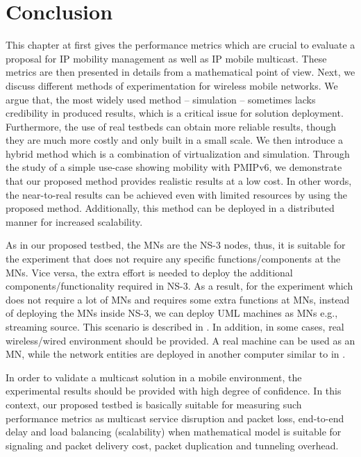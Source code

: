 \section{Conclusion}
This chapter at first gives the performance metrics which are crucial to evaluate a proposal for IP mobility management as well as IP mobile multicast. These metrics are then presented in details from a mathematical point of view. Next, we discuss different methods of experimentation for wireless mobile networks. We argue that, the most widely used method – simulation – sometimes lacks credibility in produced results, which is a critical issue for solution deployment. Furthermore, the use of real testbeds can obtain more reliable results, though they are much more costly and only built in a small scale. We then introduce a hybrid method which is a combination of virtualization and simulation. Through the study of a simple use-case showing mobility with PMIPv6, we demonstrate that our proposed method provides realistic results at a low cost. In other words, the near-to-real results can be achieved even with limited resources by using the proposed method.  Additionally, this method can be deployed in a distributed manner for increased scalability.

As in our proposed testbed, the MNs are the NS-3 nodes, thus, it is suitable for the experiment that does not require any specific functions/components at the MNs. Vice versa, the extra effort is needed to deploy the additional components/functionality required in NS-3. As a result, for the experiment which does not require a lot of MNs and requires some extra functions at MNs, instead of deploying the MNs inside NS-3, we can deploy UML machines as MNs e.g., streaming source. This scenario is described in \cite{Thinh_Springer}. In addition, in some cases, real wireless/wired environment should be provided. A real machine can be used as an MN, while the network entities are deployed in another computer similar to in \cite{PMIP_EV}.

In order to validate a multicast solution in a mobile environment, the experimental results should be provided with high degree of confidence. In this context, our proposed testbed is basically suitable for measuring such performance metrics as multicast service disruption and packet loss, end-to-end delay and load balancing (scalability) when mathematical model is suitable for signaling and packet delivery cost, packet duplication and tunneling overhead.  






